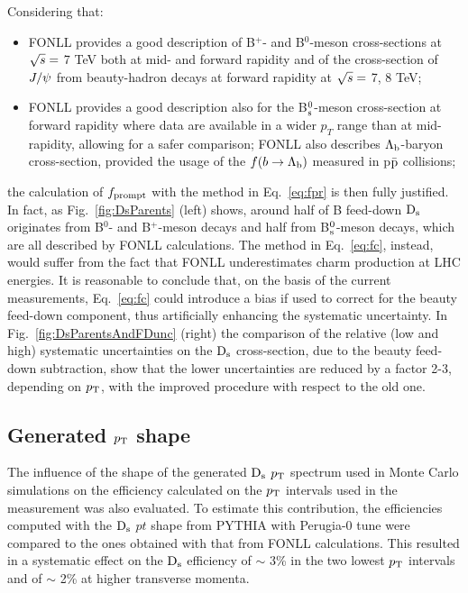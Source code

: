 Considering that:
\begin{itemize}
\item FONLL provides a good description of B$^{+}$- and B$^{0}$-meson 
cross-sections at $\sqrt{s} =$ 7 TeV both at mid- and forward rapidity and of 
the cross-section of $J/{\rm \psi}$ from beauty-hadron decays at forward rapidity at  $\sqrt{s} =$ 7, 8 TeV;
\item FONLL provides a good description also for the 
B$^0_{\rm s}$-meson cross-section at forward rapidity where data are available in a wider $p_{T}$ range 
than at mid-rapidity, allowing for a safer comparison; FONLL also describes 
$\Lambda_{\rm b}$-baryon cross-section, provided 
the usage of the $f(b\rightarrow \Lambda_{\rm b})$ measured in p$\bar{\rm p}$ collisions;
\end{itemize}
the calculation of $f_{\rm prompt}$ with the method in Eq.~\ref{eq:fpr} is then fully justified.
In fact, as Fig.~\ref{fig:DsParents} (left) shows, around half of B feed-down 
${\rm D_s}$ originates from B$^0$- and B$^+$-meson decays 
and half from B$^0_{\rm s}$-meson decays, which are all described
by FONLL calculations.
The method in Eq.~\ref{eq:fc}, instead, would suffer from the 
fact that FONLL underestimates charm production at LHC energies. 
It is reasonable to conclude that, on the basis of the current 
measurements, Eq.~\ref{eq:fc} could introduce a bias if 
used to correct for the beauty feed-down component, thus artificially enhancing 
the systematic uncertainty. In Fig.~\ref{fig:DsParentsAndFDunc} (right) the comparison of the 
relative (low and high) systematic uncertainties on the ${\rm D_s}$ cross-section, 
due to the beauty feed-down subtraction, show that the lower uncertainties are reduced by a factor 2-3, 
depending on $p_{\rm T}$, with the improved procedure with respect to the old one.

\subsection{Generated $p_{\rm T}$ shape}

The influence of the shape of the generated ${\rm D_s}$ $p_{\rm T}$ spectrum used in 
Monte Carlo simulations on the efficiency calculated on the $p_{\rm T}$ intervals used
in the measurement was also evaluated. 
To estimate this contribution, the efficiencies computed with the ${\rm D_s}$ $pt$ shape from PYTHIA with Perugia-0 tune
were compared to the ones obtained with that from FONLL calculations. 
This resulted in a systematic effect on the ${\rm D_s}$ efficiency of $\sim$ 3\% 
in the two lowest $p_{\rm T}$ intervals and of $\sim$ 2\% at higher transverse momenta.\\

